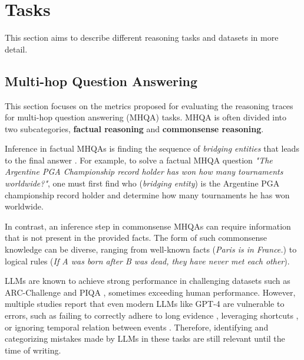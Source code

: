 \section{Tasks}
\label{sec:appendix-task}

This section aims to describe different reasoning tasks and datasets in more detail.

\subsection{Multi-hop Question Answering}
\label{sec:appendix-task-mhqa}

This section focuses on the metrics proposed for evaluating the reasoning traces for multi-hop question answering (MHQA) tasks. MHQA is often divided into two subcategories, \textbf{factual reasoning} and \textbf{commonsense reasoning}.

Inference in factual MHQAs is finding the sequence of \textit{bridging entities} that leads to the final answer \citep{yang-etal-2018-hotpotqa, talmor-berant-2018-web, kwiatkowski-etal-2019-natural}. For example, to solve a factual MHQA question \textit{"The Argentine PGA Championship record holder has won how many tournaments worldwide?"}, one must first find who (\textit{bridging entity}) is the Argentine PGA championship record holder and determine how many tournaments he has won worldwide.

In contrast, an inference step in commonsense MHQAs \citep{clark2018thinksolvedquestionanswering, mihaylov2018suitarmorconductelectricity, talmor-etal-2019-commonsenseqa, bisk2019piqareasoningphysicalcommonsense, geva-etal-2021-aristotle, trivedi-etal-2022-musique} can require information that is not present in the provided facts. The form of such commonsense knowledge can be diverse, ranging from well-known facts (\textit{Paris is in France.}) to logical rules (\textit{If A was born after B was dead, they have never met each other}).

LLMs are known to achieve strong performance in challenging datasets such as ARC-Challenge and PIQA \citep{openai2024gpt4technicalreport, anil2023palm2technicalreport}, sometimes exceeding human performance. However, multiple studies report that even modern LLMs like GPT-4 \citep{openai2024gpt4technicalreport} are vulnerable to errors, such as failing to correctly adhere to long evidence \citep{zhu-etal-2024-fanoutqa}, leveraging shortcuts \citep{schnitzler2024morehopqa}, or ignoring temporal relation between events \citep{NEURIPS2024_e560a0b2}. Therefore, identifying and categorizing mistakes made by LLMs in these tasks are still relevant until the time of writing.

